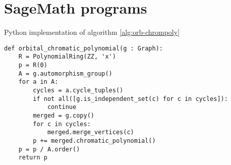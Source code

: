 \section{SageMath programs}

\begin{listing}
\caption{Python implementation of algorithm \ref{alg:orb-chrompoly}}
\begin{lstlisting}
def orbital_chromatic_polynomial(g : Graph):  
    R = PolynomialRing(ZZ, 'x')
    p = R(0)
    A = g.automorphism_group()
    for a in A:
        cycles = a.cycle_tuples()
        if not all([g.is_independent_set(c) for c in cycles]):
            continue
        merged = g.copy()
        for c in cycles:
            merged.merge_vertices(c)
        p += merged.chromatic_polynomial()
    p = p / A.order()
    return p
\end{lstlisting}
\label{prg:orb-chrompoly}
\end{listing}